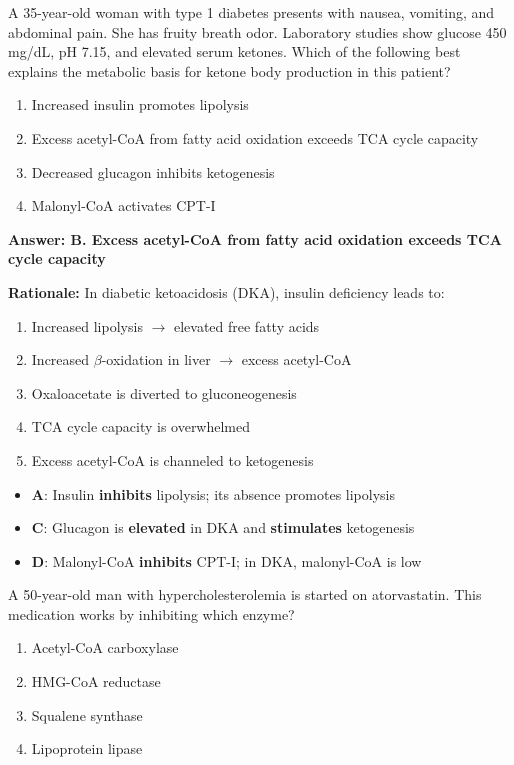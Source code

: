 \begin{exercise}
A 35-year-old woman with type 1 diabetes presents with nausea, vomiting, and abdominal pain. She has fruity breath odor. Laboratory studies show glucose 450 mg/dL, pH 7.15, and elevated serum ketones. Which of the following best explains the metabolic basis for ketone body production in this patient?
\begin{enumerate}[label=\Alph*.]
    \item Increased insulin promotes lipolysis
    \item Excess acetyl-CoA from fatty acid oxidation exceeds TCA cycle capacity
    \item Decreased glucagon inhibits ketogenesis
    \item Malonyl-CoA activates CPT-I
\end{enumerate}
\end{exercise}

\begin{solution}
\textbf{Answer: B. Excess acetyl-CoA from fatty acid oxidation exceeds TCA cycle capacity}

\textbf{Rationale:} In diabetic ketoacidosis (DKA), insulin deficiency leads to:
\begin{enumerate}
    \item Increased lipolysis $\rightarrow$ elevated free fatty acids
    \item Increased $\beta$-oxidation in liver $\rightarrow$ excess acetyl-CoA
    \item Oxaloacetate is diverted to gluconeogenesis
    \item TCA cycle capacity is overwhelmed
    \item Excess acetyl-CoA is channeled to ketogenesis
\end{enumerate}

\begin{itemize}
    \item \textbf{A}: Insulin \textbf{inhibits} lipolysis; its absence promotes lipolysis
    \item \textbf{C}: Glucagon is \textbf{elevated} in DKA and \textbf{stimulates} ketogenesis
    \item \textbf{D}: Malonyl-CoA \textbf{inhibits} CPT-I; in DKA, malonyl-CoA is low
\end{itemize}
\end{solution}

\begin{exercise}
A 50-year-old man with hypercholesterolemia is started on atorvastatin. This medication works by inhibiting which enzyme?
\begin{enumerate}[label=\Alph*.]
    \item Acetyl-CoA carboxylase
    \item HMG-CoA reductase
    \item Squalene synthase
    \item Lipoprotein lipase
\end{enumerate}
\end{exercise}

